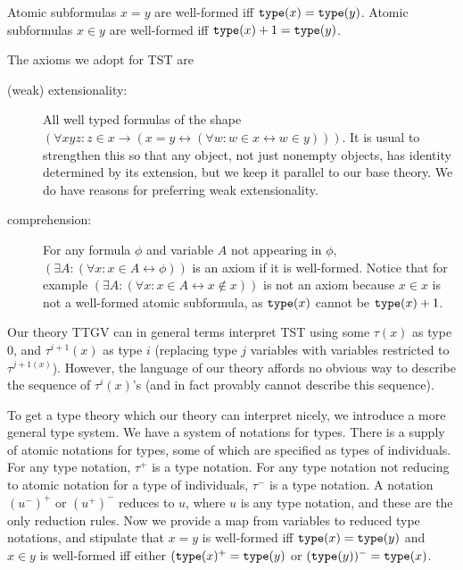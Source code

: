 \documentclass[12pt]{article}
\begin{document}
Atomic subformulas $x=y$ are well-formed iff ${\tt type}(x)={\tt type}(y)$.   Atomic subformulas $x\in y$ are well-formed iff ${\tt type}(x)+1={\tt type}(y)$.  

The axioms we adopt for TST are

\begin{description}

\item[(weak) extensionality:]  All well typed formulas of the shape $(\forall xyz:z \in x \rightarrow (x = y \leftrightarrow (\forall w:w \in x \leftrightarrow w \in y)))$.  It is usual to strengthen this so that any object, not just nonempty objects, has identity determined by its extension, but we keep it parallel to our base theory.  We do have reasons for preferring weak extensionality.

\item[comprehension:]  For any formula $\phi$ and variable $A$ not appearing in $\phi$, $(\exists A:(\forall x:x \in A \leftrightarrow \phi))$ is an axiom if it is well-formed.  Notice that for example $(\exists A:(\forall x:x \in A \leftrightarrow x \not\in x))$ is not an axiom because $x \in x$ is not a well-formed atomic subformula, as ${\tt type}(x)$ cannot be ${\tt type}(x)+1$.

\end{description}

Our theory TTGV can in general terms interpret TST  using some $\tau(x)$ as type 0, and $\tau^{i+1}(x)$ as type $i$ (replacing type $j$ variables with variables restricted to $\tau^{j+1(x)}$).  However, the language of our theory affords no obvious way to describe the sequence of $\tau^i(x)$'s (and in fact provably cannot describe this sequence).

To get a type theory which our theory can interpret nicely, we introduce a more general type system.   We have a system of notations for types.  There is a supply of atomic notations for types, some of which are specified as types of individuals.  For any type notation, $\tau^+$ is a type notation.  For any type notation not reducing  to atomic notation for a type of individuals,
$\tau^-$ is a type notation.  A notation $(u^-)^+$ or $(u^+)^-$ reduces to $u$, where $u$ is any type notation, and these are the only reduction rules.  Now we provide a map from variables to reduced type notations, and stipulate that $x=y$ is well-formed iff ${\tt type}(x) = {\tt type}(y)$ and $x \in y$ is well-formed iff either $({\tt type}(x)^+ = {\tt type}(y)$
or $({\tt type}(y))^- = {\tt type}(x)$.
\end{document}
